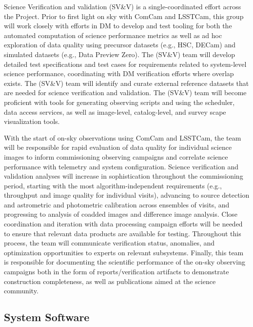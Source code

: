 \documentclass[SE,lsstdraft,authoryear,toc]{lsstdoc, lsstdraft}
\begin{document}
Science Verification and validation (SV\&V) is a single-coordinated effort across the Project.
Prior to first light on sky with ComCam and LSSTCam, this group will work closely with efforts in DM to develop and test tooling for both the automated computation of science performance metrics as well as ad hoc exploration of data quality using precursor datasets (e.g., HSC, DECam) and simulated datasets (e.g., Data Preview Zero).
The (SV\&V) team will develop detailed test specifications and test cases for requirements related to system-level science performance, coordinating with DM verification efforts where overlap exists.
The (SV\&V) team will identify and curate external reference datasets that are needed for science verification and validation.
The (SV\&V) team will become proficient with tools for generating observing scripts and using the scheduler, data access services, as well as image-level, catalog-level, and survey scape visualization tools.

With the start of on-sky observations using ComCam and LSSTCam, the team will be responsible for rapid evaluation of data quality for individual science images to inform commissioning observing campaigns and correlate science performance with telemetry and system configuration.
Science verification and validation analyses will increase in sophistication throughout the commissioning period, starting with the most algorithm-independent requirements (e.g., throughput and image quality for individual visits), advancing to source detection and astrometric and photometric calibration across ensembles of visits, and progressing to analysis of coadded images and difference image analysis.
Close coordination and iteration with data processing campaign efforts will be needed to ensure that relevant data products are available for testing.
Throughout this process, the team will communicate verification status, anomalies, and optimization opportunities to experts on relevant subsystems.
Finally, this team is responsible for documenting the scientific performance of the on-sky observing campaigns both in the form of reports/verification artifacts to demonstrate construction completeness, as well as publications aimed at the science community.

\subsection{System Software}
\end{document}
